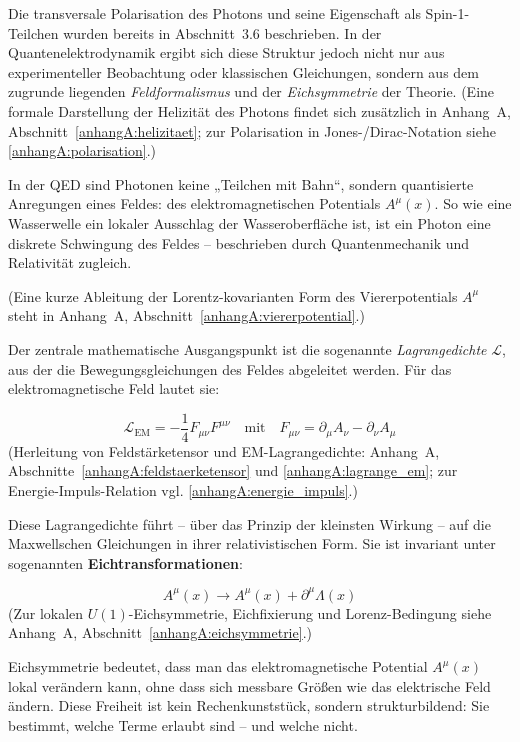 Die transversale Polarisation des Photons und seine Eigenschaft als Spin\mbox{-}1\mbox{-}Teilchen wurden bereits in Abschnitt~3.6 beschrieben.
In der Quantenelektrodynamik ergibt sich diese Struktur jedoch nicht nur aus experimenteller Beobachtung oder klassischen Gleichungen, sondern aus dem zugrunde liegenden \emph{Feldformalismus} und der \emph{Eichsymmetrie} der Theorie.
(Eine formale Darstellung der Helizität des Photons findet sich zusätzlich in Anhang~A, Abschnitt~\ref{anhangA:helizitaet}; zur Polarisation in Jones-/Dirac-Notation siehe \ref{anhangA:polarisation}.)

\medskip
\begin{tcolorbox}[physikbox, title=Was ist der Feldformalismus?]
	\label{box:was ist Feldformalismus}
	\small
	In der QED sind Photonen keine „Teilchen mit Bahn“, sondern quantisierte Anregungen eines Feldes: des elektromagnetischen Potentials \( A^\mu(x) \). So wie eine Wasserwelle ein lokaler Ausschlag der Wasseroberfläche ist, ist ein Photon eine diskrete Schwingung des Feldes – beschrieben durch Quantenmechanik und Relativität zugleich.
\end{tcolorbox}
\medskip
{}
(Eine kurze Ableitung der Lorentz-kovarianten Form des Viererpotentials \(A^\mu\) steht in Anhang~A, Abschnitt~\ref{anhangA:viererpotential}.)

Der zentrale mathematische Ausgangspunkt ist die sogenannte \emph{Lagrangedichte} \( \mathcal{L} \), aus der die Bewegungsgleichungen des Feldes abgeleitet werden.
Für das elektromagnetische Feld lautet sie:

\[
\mathcal{L}_{\text{EM}} = -\frac{1}{4} F_{\mu\nu} F^{\mu\nu}
\quad \text{mit} \quad F_{\mu\nu} = \partial_\mu A_\nu - \partial_\nu A_\mu
\]
(Herleitung von Feldstärketensor und EM-Lagrangedichte: Anhang~A, Abschnitte~\ref{anhangA:feldstaerketensor} und \ref{anhangA:lagrange_em}; zur Energie-Impuls-Relation vgl. \ref{anhangA:energie_impuls}.)

Diese Lagrangedichte führt – über das Prinzip der kleinsten Wirkung – auf die Maxwellschen Gleichungen in ihrer relativistischen Form.
Sie ist invariant unter sogenannten \textbf{Eichtransformationen}:

\[
A^\mu(x) \rightarrow A^\mu(x) + \partial^\mu \Lambda(x)
\]
(Zur lokalen \(U(1)\)-Eichsymmetrie, Eichfixierung und  Lorenz-Bedingung siehe Anhang~A, Abschnitt~\ref{anhangA:eichsymmetrie}.)
\medskip
\begin{tcolorbox}[physikbox, title=Was bedeutet Eichsymmetrie?]
	\label{box:was bedeutet Eichsy}
	\small
	Eichsymmetrie bedeutet, dass man das elektromagnetische Potential \( A^\mu(x) \) lokal verändern kann, ohne dass sich messbare Größen wie das elektrische Feld ändern. Diese Freiheit ist kein Rechenkunststück, sondern strukturbildend: Sie bestimmt, welche Terme erlaubt sind – und welche nicht.
\end{tcolorbox}

